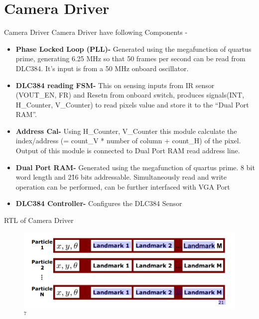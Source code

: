\documentclass{beamer}
\begin{document}
\section{Camera Driver}
\begin{frame}{Camera Driver}
    Camera Driver have following Components -
    \begin{itemize}
        \item \textbf{Phase Locked Loop (PLL)-} Generated using the megafunction of quartus prime, generating 6.25 MHz so that 50 frames per second can be read from DLC384. It’s input is from a 50 MHz onboard oscillator.
        \item \textbf{DLC384 reading FSM-} This on sensing inputs from IR sensor (VOUT\_EN, FR) and Resetn from onboard switch, produces signals(INT, H\_Counter, V\_Counter) to read pixels value and store it to the “Dual Port RAM”.
        \item \textbf{Address Cal-} Using H\_Counter, V\_Counter this module calculate the index/address (= count\_V * number of column + count\_H) of the pixel. Output of this module is connected to Dual Port RAM read address line.
        \item \textbf{Dual Port RAM-} Generated using the megafunction of quartus prime. 8 bit word length and 2\^16 bits addressable. Simultaneously read and write operation can be performed, can be further interfaced with VGA Port 
        \item \textbf{DLC384 Controller-} Configures the DLC384 Sensor
    \end{itemize}
\end{frame}


\begin{frame}{RTL of Camera Driver}
    \begin{figure}
        \centering
        \includegraphics[width=\textwidth]{RBPF_SLAM.png}$^{7}$
    \end{figure}
\end{frame}


\end{document}
